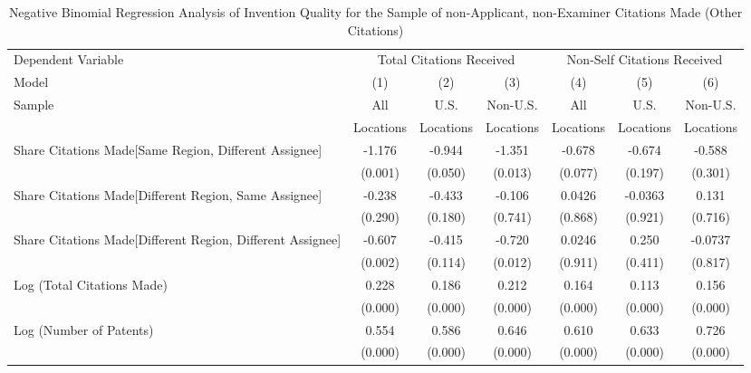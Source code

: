 \begin{sidewaystable}[htbp]\centering
\captionsetup{
  labelformat=center,
  labelsep=newline,
  justification=justified,
  margin=.1\textwidth
}
\caption{Negative Binomial Regression Analysis of Invention Quality for the Sample of non-Applicant, non-Examiner Citations Made (Other Citations) \label{o.model123192021}}
\small
\onehalfspacing
\begin{tabular}{l*{6}{c}}
\hline\hline
 Dependent Variable&\multicolumn{3}{c}{Total Citations Received}&\multicolumn{3}{c}{Non-Self Citations Received}\\
                Model&\multicolumn{1}{c}{(1)}&\multicolumn{1}{c}{(2)}&\multicolumn{1}{c}{(3)}&\multicolumn{1}{c}{(4)}&\multicolumn{1}{c}{(5)}&\multicolumn{1}{c}{(6)}\\
                 \hline
 \multirow{2}{*}{Sample}&\multicolumn{1}{c}{All}&\multicolumn{1}{c}{U.S.}&\multicolumn{1}{c}{Non-U.S.}&\multicolumn{1}{c}{All}&\multicolumn{1}{c}{U.S.}&\multicolumn{1}{c}{Non-U.S.}\\       
  &\multicolumn{1}{c}{Locations}&\multicolumn{1}{c}{Locations}&\multicolumn{1}{c}{Locations}&\multicolumn{1}{c}{Locations}&\multicolumn{1}{c}{Locations}&\multicolumn{1}{c}{Locations}\\        
\hline
Share Citations Made[Same Region, Different Assignee]&   -1.176&   -0.944&   -1.351&   -0.678&   -0.674&   -0.588\\
                &  (0.001)&  (0.050)&  (0.013)&  (0.077)&  (0.197)&  (0.301)\\
Share Citations Made[Different Region, Same Assignee]&   -0.238&   -0.433&   -0.106&   0.0426&  -0.0363&    0.131\\
                &  (0.290)&  (0.180)&  (0.741)&  (0.868)&  (0.921)&  (0.716)\\
Share Citations Made[Different Region, Different Assignee]&   -0.607&   -0.415&   -0.720&   0.0246&    0.250&  -0.0737\\
                &  (0.002)&  (0.114)&  (0.012)&  (0.911)&  (0.411)&  (0.817)\\
Log (Total Citations Made)&    0.228&    0.186&    0.212&    0.164&    0.113&    0.156\\
                &  (0.000)&  (0.000)&  (0.000)&  (0.000)&  (0.000)&  (0.000)\\
Log (Number of Patents)&    0.554&    0.586&    0.646&    0.610&    0.633&    0.726\\
                &  (0.000)&  (0.000)&  (0.000)&  (0.000)&  (0.000)&  (0.000)\\

\end{tabular}
\end{sidewaystable}
